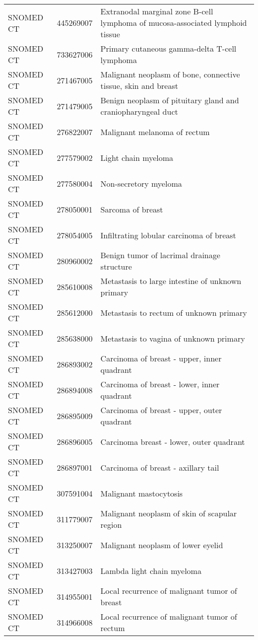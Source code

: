 \begin{longtable}{p{}p{}p{}}
  SNOMED CT & 445269007 & Extranodal marginal zone B-cell lymphoma of mucosa-associated lymphoid tissue \\ 
  SNOMED CT & 733627006 & Primary cutaneous gamma-delta T-cell lymphoma \\ 
  SNOMED CT & 271467005 & Malignant neoplasm of bone, connective tissue, skin and breast \\ 
  SNOMED CT & 271479005 & Benign neoplasm of pituitary gland and craniopharyngeal duct \\ 
  SNOMED CT & 276822007 & Malignant melanoma of rectum \\ 
  SNOMED CT & 277579002 & Light chain myeloma \\ 
  SNOMED CT & 277580004 & Non-secretory myeloma \\ 
  SNOMED CT & 278050001 & Sarcoma of breast \\ 
  SNOMED CT & 278054005 & Infiltrating lobular carcinoma of breast \\ 
  SNOMED CT & 280960002 & Benign tumor of lacrimal drainage structure \\ 
  SNOMED CT & 285610008 & Metastasis to large intestine of unknown primary \\ 
  SNOMED CT & 285612000 & Metastasis to rectum of unknown primary \\ 
  SNOMED CT & 285638000 & Metastasis to vagina of unknown primary \\ 
  SNOMED CT & 286893002 & Carcinoma of breast - upper, inner quadrant \\ 
  SNOMED CT & 286894008 & Carcinoma of breast - lower, inner quadrant \\ 
  SNOMED CT & 286895009 & Carcinoma of breast - upper, outer quadrant \\ 
  SNOMED CT & 286896005 & Carcinoma breast - lower, outer quadrant \\ 
  SNOMED CT & 286897001 & Carcinoma of breast - axillary tail \\ 
  SNOMED CT & 307591004 & Malignant mastocytosis \\ 
  SNOMED CT & 311779007 & Malignant neoplasm of skin of scapular region \\ 
  SNOMED CT & 313250007 & Malignant neoplasm of lower eyelid \\ 
  SNOMED CT & 313427003 & Lambda light chain myeloma \\ 
  SNOMED CT & 314955001 & Local recurrence of malignant tumor of breast \\ 
  SNOMED CT & 314966008 & Local recurrence of malignant tumor of rectum \\ 

\end{longtable}

